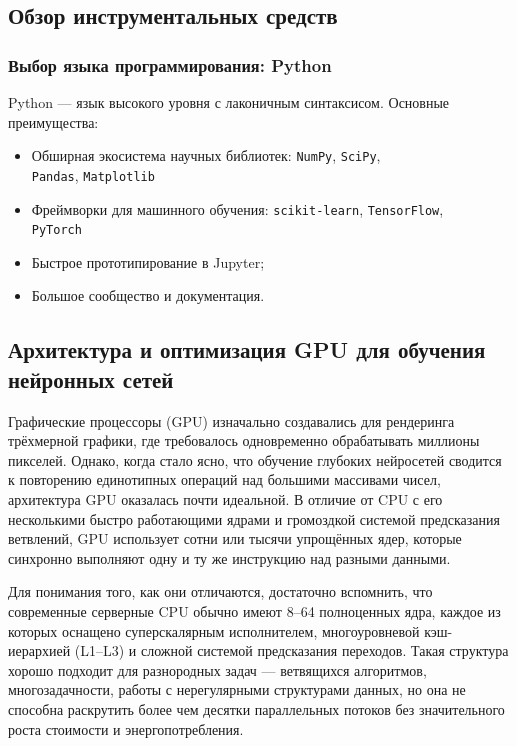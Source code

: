 \subsection{Обзор инструментальных средств}
\label{sec:tools}

\subsubsection{Выбор языка программирования: Python}
\label{sec:tools_python}

Python — язык высокого уровня с лаконичным синтаксисом. Основные преимущества:
\begin{itemize}
  \item Обширная экосистема научных библиотек: \texttt{NumPy}, \texttt{SciPy}, \\ \texttt{Pandas}, \texttt{Matplotlib}
  \item Фреймворки для машинного обучения: \texttt{scikit-learn}, \texttt{TensorFlow}, \\ \texttt{PyTorch}
  \item Быстрое прототипирование в Jupyter;
  \item Большое сообщество и документация.
\end{itemize}

\subsection{Архитектура и оптимизация GPU для обучения нейронных сетей}
\label{ssec:gpu_architecture}

Графические процессоры (GPU) изначально создавались для рендеринга трёхмерной графики, где требовалось одновременно обрабатывать миллионы пикселей. Однако, когда стало ясно, что обучение глубоких нейросетей сводится к повторению единотипных операций над большими массивами чисел, архитектура GPU оказалась почти идеальной. В отличие от CPU с его несколькими быстро работающими ядрами и громоздкой системой предсказания ветвлений, GPU использует сотни или тысячи упрощённых ядер, которые синхронно выполняют одну и ту же инструкцию над разными данными.   

Для понимания того, как они отличаются, достаточно вспомнить, что современные серверные CPU обычно имеют 8–64 полноценных ядра, каждое из которых оснащено суперскалярным исполнителем, многоуровневой кэш-иерархией (L1–L3) и сложной системой предсказания переходов. Такая структура хорошо подходит для разнородных задач — ветвящихся алгоритмов, многозадачности, работы с нерегулярными структурами данных, но она не способна раскрутить более чем десятки параллельных потоков без значительного роста стоимости и энергопотребления.  

